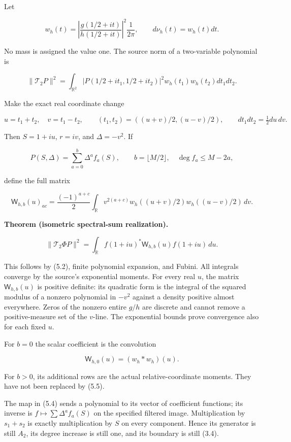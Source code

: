 Let

\[w_h(t)=\left|\frac{g(1/2+it)}{h(1/2+it)}\right|^2\frac1{2\pi},\qquad d\nu_h(t)=w_h(t)dt.\tag{5.1}\]

No mass is assigned the value one. The source norm of a two-variable
polynomial is

\[\|\mathcal T_2P\|^2=\int_{\mathbb R^2}|P(1/2+it_1,1/2+it_2)|^2w_h(t_1)w_h(t_2)dt_1dt_2.\]

Make the exact real coordinate change

\[u=t_1+t_2,\quad v=t_1-t_2,\qquad
(t_1,t_2)=((u+v)/2,(u-v)/2),\qquad dt_1dt_2=\tfrac12du\,dv.\tag{5.2}\]

Then \(S=1+iu\), \(r=iv\), and \(\Delta=-v^2\). If

\[P(S,\Delta)=\sum_{a=0}^{b}\Delta^a f_a(S),\qquad b=\lfloor M/2\rfloor,\quad\deg f_a\le M-2a,\]

define the full matrix

\[\boxed{\mathsf W_{h,b}(u)_{ac}
=\frac{(-1)^{a+c}}2\int_{\mathbb R}v^{2(a+c)}
w_h((u+v)/2)w_h((u-v)/2)\,dv.}\tag{5.3}\]

\textbf{Theorem (isometric spectral-sum realization).}

\[\boxed{\|\mathcal T_2\Phi P\|^2
=\int_{\mathbb R}f(1+iu)^*\mathsf W_{h,b}(u)f(1+iu)\,du.}\tag{5.4}\]

This follows by (5.2), finite polynomial expansion, and Fubini. All
integrals converge by the source's exponential moments. For every real
\(u\), the matrix \(\mathsf W_{h,b}(u)\) is positive definite: its
quadratic form is the integral of the squared modulus of a nonzero
polynomial in \(-v^2\) against a density positive almost everywhere.
Zeros of the nonzero entire \(g/h\) are discrete and cannot remove a
positive-measure set of the \(v\)-line. The exponential bounds prove
convergence also for each fixed \(u\).

For \(b=0\) the scalar coefficient is the convolution

\[\mathsf W_{h,0}(u)=(w_h*w_h)(u).\tag{5.5}\]

For \(b>0\), its additional rows are the actual relative-coordinate
moments. They have not been replaced by (5.5).

The map in (5.4) sends a polynomial to its vector of coefficient
functions; its inverse is \(f\mapsto\sum\Delta^af_a(S)\) on the
specified filtered image. Multiplication by \(s_1+s_2\) is exactly
multiplication by \(S\) on every component. Hence its generator is still
\(A_2\), its degree increase is still one, and its boundary is still
(3.4).

